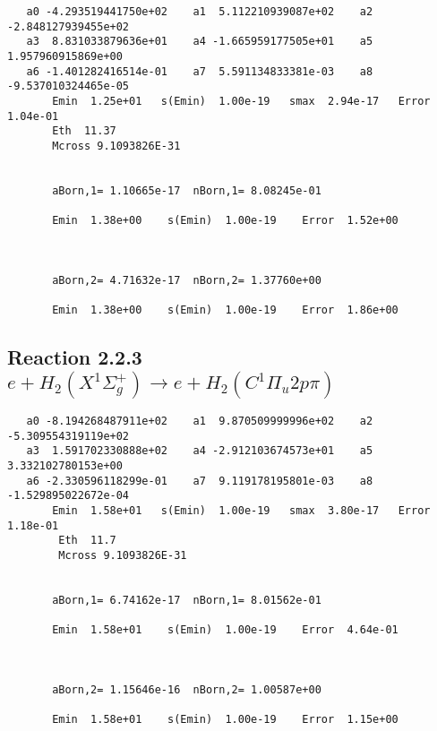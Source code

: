 \documentclass[12pt,dvipdfm]{article}
\begin{document}
\begin{small}\begin{verbatim}
   a0 -4.293519441750e+02    a1  5.112210939087e+02    a2 -2.848127939455e+02
   a3  8.831033879636e+01    a4 -1.665959177505e+01    a5  1.957960915869e+00
   a6 -1.401282416514e-01    a7  5.591134833381e-03    a8 -9.537010324465e-05
       Emin  1.25e+01   s(Emin)  1.00e-19   smax  2.94e-17   Error  1.04e-01
       Eth  11.37
       Mcross 9.1093826E-31


       aBorn,1= 1.10665e-17  nBorn,1= 8.08245e-01

       Emin  1.38e+00    s(Emin)  1.00e-19    Error  1.52e+00



       aBorn,2= 4.71632e-17  nBorn,2= 1.37760e+00

       Emin  1.38e+00    s(Emin)  1.00e-19    Error  1.86e+00
\end{verbatim}\end{small}





\newpage
\subsection{
Reaction 2.2.3 $e + H_2(X^1\Sigma_g^+) \rightarrow e + H_2(C^1\Pi_u2p\pi) $}














\begin{small}\begin{verbatim}
   a0 -8.194268487911e+02    a1  9.870509999996e+02    a2 -5.309554319119e+02
   a3  1.591702330888e+02    a4 -2.912103674573e+01    a5  3.332102780153e+00
   a6 -2.330596118299e-01    a7  9.119178195801e-03    a8 -1.529895022672e-04
       Emin  1.58e+01   s(Emin)  1.00e-19   smax  3.80e-17   Error  1.18e-01
        Eth  11.7
        Mcross 9.1093826E-31


       aBorn,1= 6.74162e-17  nBorn,1= 8.01562e-01

       Emin  1.58e+01    s(Emin)  1.00e-19    Error  4.64e-01



       aBorn,2= 1.15646e-16  nBorn,2= 1.00587e+00

       Emin  1.58e+01    s(Emin)  1.00e-19    Error  1.15e+00
\end{verbatim}\end{small}
\end{document}
